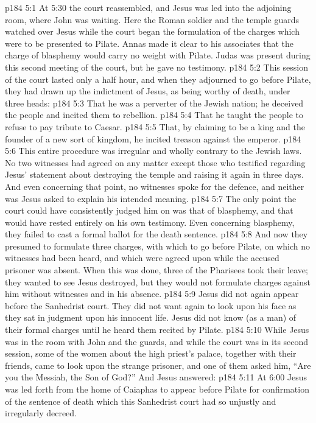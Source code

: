 \vs p184 5:1 At 5:30 the court reassembled, and Jesus was led into the adjoining room, where John was waiting. Here the Roman soldier and the temple guards watched over Jesus while the court began the formulation of the charges which were to be presented to Pilate. Annas made it clear to his associates that the charge of blasphemy would carry no weight with Pilate. Judas was present during this second meeting of the court, but he gave no testimony.
\vs p184 5:2 This session of the court lasted only a half hour, and when they adjourned to go before Pilate, they had drawn up the indictment of Jesus, as being worthy of death, under three heads:
\vs p184 5:3 \bibnobreakspace That he was a perverter of the Jewish nation; he deceived the people and incited them to rebellion.
\vs p184 5:4 \bibnobreakspace That he taught the people to refuse to pay tribute to Caesar.
\vs p184 5:5 \bibnobreakspace That, by claiming to be a king and the founder of a new sort of kingdom, he incited treason against the emperor.
\vs p184 5:6 \pc This entire procedure was irregular and wholly contrary to the Jewish laws. No two witnesses had agreed on any matter except those who testified regarding Jesus’ statement about destroying the temple and raising it again in three days. And even concerning that point, no witnesses spoke for the defence, and neither was Jesus asked to explain his intended meaning.
\vs p184 5:7 The only point the court could have consistently judged him on was that of blasphemy, and that would have rested entirely on his own testimony. Even concerning blasphemy, they failed to cast a formal ballot for the death sentence.
\vs p184 5:8 And now they presumed to formulate three charges, with which to go before Pilate, on which no witnesses had been heard, and which were agreed upon while the accused prisoner was absent. When this was done, three of the Pharisees took their leave; they wanted to see Jesus destroyed, but they would not formulate charges against him without witnesses and in his absence.
\vs p184 5:9 Jesus did not again appear before the Sanhedrist court. They did not want again to look upon his face as they sat in judgment upon his innocent life. Jesus did not know (as a man) of their formal charges until he heard them recited by Pilate.
\vs p184 5:10 \pc While Jesus was in the room with John and the guards, and while the court was in its second session, some of the women about the high priest’s palace, together with their friends, came to look upon the strange prisoner, and one of them asked him, “Are you the Messiah, the Son of God?” And Jesus answered: 
\vs p184 5:11 At 6:00 Jesus was led forth from the home of Caiaphas to appear before Pilate for confirmation of the sentence of death which this Sanhedrist court had so unjustly and irregularly decreed.
